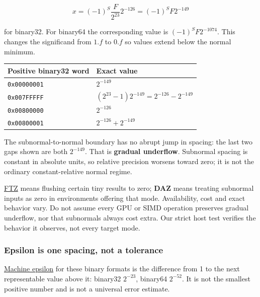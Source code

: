 \[
x=(-1)^S\frac{F}{2^{23}}2^{-126}=(-1)^S F2^{-149}
\]

for binary32. For binary64 the corresponding value is \((-1)^S F2^{-1074}\). This changes the significand from \(1.f\) to \(0.f\) so values extend below the normal minimum.

{\def\LTcaptype{none} %
\begin{longtable}[]{@{}ll@{}}
\toprule\noalign{}
Positive binary32 word & Exact value \\
\midrule\noalign{}
\endhead
\bottomrule\noalign{}
\endlastfoot
\texttt{0x00000001} & \(2^{-149}\) \\
\texttt{0x007FFFFF} & \((2^{23}-1)2^{-149}=2^{-126}-2^{-149}\) \\
\texttt{0x00800000} & \(2^{-126}\) \\
\texttt{0x00800001} & \(2^{-126}+2^{-149}\) \\
\end{longtable}
}

The subnormal-to-normal boundary has no abrupt jump in spacing: the last two gaps shown are both \(2^{-149}\). That is \textbf{gradual underflow}. Subnormal spacing is constant in absolute units, so relative precision worsens toward zero; it is not the ordinary constant-relative normal regime.

\hyperref[appendix-e979eb012782]{FTZ} means flushing certain tiny results to zero; \textbf{DAZ} means treating subnormal inputs as zero in environments offering that mode. Availability, cost and exact behavior vary. Do not assume every GPU or SIMD operation preserves gradual underflow, nor that subnormals always cost extra. Our strict host test verifies the behavior it observes, not every target mode.

\subsubsection{Epsilon is one spacing, not a tolerance}\label{01-foundations-i-ch001-epsilon-is-one-spacing-not-a-tolerance}

\hypertarget{01-foundations-i-ch001-epsilon-is-one-spacing-not-a-tolerance}{}

\hyperref[appendix-390ea641da54]{Machine epsilon} for these binary formats is the difference from 1 to the next representable value above it: binary32 \(2^{-23}\), binary64 \(2^{-52}\). It is not the smallest positive number and is not a universal error estimate.

